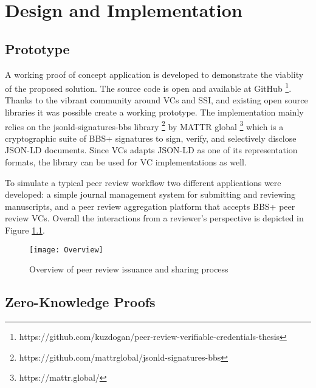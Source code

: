 
\chapter{Design and Implementation}\label{chapter:background}

\section{Prototype}

A working proof of concept application is developed to demonstrate the viablity of the proposed solution. The source code is open and available at GitHub \footnote{https://github.com/kuzdogan/peer-review-verifiable-credentials-thesis}. Thanks to the vibrant community around VCs and SSI, and existing open source libraries it was possible create a working prototype. The implementation mainly relies on the jsonld-signatures-bbs library \footnote{https://github.com/mattrglobal/jsonld-signatures-bbs} by MATTR global \footnote{https://mattr.global/} which is a cryptographic suite of BBS+ signatures to sign, verify, and selectively disclose JSON-LD documents. Since VCs adapts JSON-LD as one of its representation formats, the library can be used for VC implementations as well.

To simulate a typical peer review workflow two different applications were developed: a simple journal management system for submitting and reviewing manuscripts, and a peer review aggregation platform that accepts BBS+ peer review VCs. Overall the interactions from a reviewer's perspective is depicted in Figure \ref{fig:overview}.

\begin{figure}[htpb]
  \centering
  \texttt{[image: Overview]}
  \caption{Overview of peer review issuance and sharing process} \label{fig:overview}
\end{figure}


\section{Zero-Knowledge Proofs}

